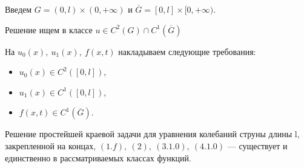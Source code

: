 Введем $G=(0, l) \times (0, +\infty)$ и $\overline{G}=[0, l] \times [0, +\infty)$.

Решение ищем в классе $u \in C^2(G) \cap C^1(\overline{G})$

На $u_0(x),\ u_1(x),\ f(x,t)$ накладываем следующие требования:
\begin{itemize}[nosep, leftmargin=1.5cm]
	\item $u_0(x) \in C^2([0,l])$,
	\item $u_1(x) \in C^1([0,l])$,
	\item $f(x,t) \in C^1(\overline{G})$.
\end{itemize}

\begin{theorem}
	Решение простейшей краевой задачи для уравнения колебаний струны длины l, закрепленной на концах, $(1.f),\ (2),\ (3.1.0),\ (4.1.0)$ --- существует и единственно в рассматриваемых классах функций.
\end{theorem}

